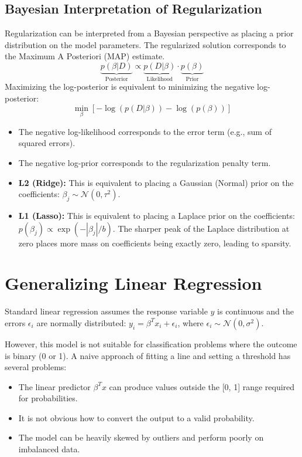\documentclass{article}
\begin{document}
\begin{multicols}{2}
\subsection{Bayesian Interpretation of Regularization}
Regularization can be interpreted from a Bayesian perspective as placing a prior distribution on the model parameters. The regularized solution corresponds to the Maximum A Posteriori (MAP) estimate.
$$ \underbrace{p(\beta|D)}_{\text{Posterior}} \propto \underbrace{p(D|\beta)}_{\text{Likelihood}} \cdot \underbrace{p(\beta)}_{\text{Prior}} $$
Maximizing the log-posterior is equivalent to minimizing the negative log-posterior:
$$ \min_{\beta} [-\log(p(D|\beta)) - \log(p(\beta))] $$
\begin{itemize}
    \item The negative log-likelihood corresponds to the error term (e.g., sum of squared errors).
    \item The negative log-prior corresponds to the regularization penalty term.
    \item \textbf{L2 (Ridge):} This is equivalent to placing a Gaussian (Normal) prior on the coefficients: $\beta_j \sim \mathcal{N}(0, \tau^2)$.
    \item \textbf{L1 (Lasso):} This is equivalent to placing a Laplace prior on the coefficients: $p(\beta_j) \propto \exp(-|\beta_j|/b)$. The sharper peak of the Laplace distribution at zero places more mass on coefficients being exactly zero, leading to sparsity.
\end{itemize}

\section{Generalizing Linear Regression}
Standard linear regression assumes the response variable $y$ is continuous and the errors $\epsilon_i$ are normally distributed: $y_i = \beta^T x_i + \epsilon_i$, where $\epsilon_i \sim \mathcal{N}(0, \sigma^2)$.

However, this model is not suitable for classification problems where the outcome is binary (0 or 1). A naive approach of fitting a line and setting a threshold has several problems:
\begin{itemize}
    \item The linear predictor $\beta^T x$ can produce values outside the [0, 1] range required for probabilities.
    \item It is not obvious how to convert the output to a valid probability.
    \item The model can be heavily skewed by outliers and perform poorly on imbalanced data.
\end{itemize}


\end{multicols}
\end{document}
